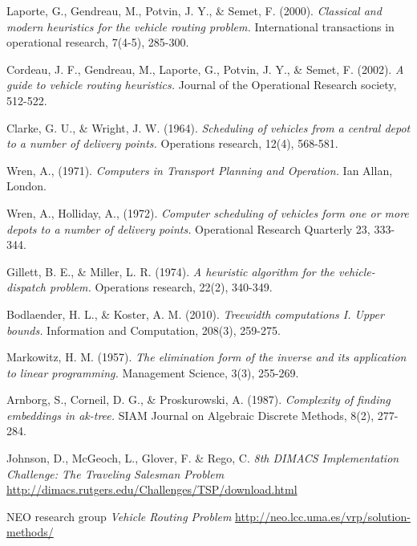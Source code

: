 \documentclass[titlepage, 12pt]{article}
\begin{document}
\begin{thebibliography}{9}
        Laporte, G., Gendreau, M., Potvin, J. Y., \& Semet, F. (2000).
        \emph{Classical and modern heuristics for the vehicle routing problem.}
        International transactions in operational research, 7(4-5), 285-300.

        Cordeau, J. F., Gendreau, M., Laporte, G., Potvin, J. Y., \& Semet, F. (2002).
        \emph{A guide to vehicle routing heuristics.}
        Journal of the Operational Research society, 512-522.

        Clarke, G. U., \& Wright, J. W. (1964).
        \emph{Scheduling of vehicles from a central depot to a number of delivery points.}
        Operations research, 12(4), 568-581.

        Wren, A., (1971).
        \emph{Computers in Transport Planning and Operation.}
        Ian Allan, London.

        Wren, A., Holliday, A., (1972).
        \emph{Computer scheduling of vehicles form one or more depots to a number of delivery points.}
        Operational Research Quarterly 23, 333-344.

        Gillett, B. E., \& Miller, L. R. (1974).
        \emph{A heuristic algorithm for the vehicle-dispatch problem.}
        Operations research, 22(2), 340-349.

        Bodlaender, H. L., \& Koster, A. M. (2010).
        \emph{Treewidth computations I. Upper bounds.}
        Information and Computation, 208(3), 259-275.

        Markowitz, H. M. (1957).
        \emph{The elimination form of the inverse and its application to linear programming.}
        Management Science, 3(3), 255-269.

        Arnborg, S., Corneil, D. G., \& Proskurowski, A. (1987).
        \emph{Complexity of finding embeddings in ak-tree.}
        SIAM Journal on Algebraic Discrete Methods, 8(2), 277-284.

        Johnson, D., McGeoch, L., Glover, F. \& Rego, C.
        \emph{8th DIMACS Implementation Challenge: The Traveling Salesman Problem}
        \url{http://dimacs.rutgers.edu/Challenges/TSP/download.html}

        NEO research group
        \emph{Vehicle Routing Problem}
        \url{http://neo.lcc.uma.es/vrp/solution-methods/}


\end{thebibliography}
\end{document}
